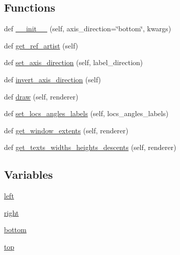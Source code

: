 \subsection*{Functions}
\begin{DoxyCompactItemize}
\item 
def \hyperlink{namespaceaxisartist_1_1axis__artist_a1e2971fc727b631279986c595e3bc496}{\+\_\+\+\_\+init\+\_\+\+\_\+} (self, axis\+\_\+direction=\char`\"{}bottom\char`\"{}, kwargs)
\item 
def \hyperlink{namespaceaxisartist_1_1axis__artist_a1740504eeff89a936875b4afc3877d80}{get\+\_\+ref\+\_\+artist} (self)
\item 
def \hyperlink{namespaceaxisartist_1_1axis__artist_aeb95e617b6b9d1470337ba529bc8f297}{set\+\_\+axis\+\_\+direction} (self, label\+\_\+direction)
\item 
def \hyperlink{namespaceaxisartist_1_1axis__artist_a51baf8d8c240bcffcaee93cf40f9e477}{invert\+\_\+axis\+\_\+direction} (self)
\item 
def \hyperlink{namespaceaxisartist_1_1axis__artist_ab4988671b9cff3610746758c6d74ffb0}{draw} (self, renderer)
\item 
def \hyperlink{namespaceaxisartist_1_1axis__artist_ad360dcaf18e33e925cb4653b00eab87a}{set\+\_\+locs\+\_\+angles\+\_\+labels} (self, locs\+\_\+angles\+\_\+labels)
\item 
def \hyperlink{namespaceaxisartist_1_1axis__artist_a47cb2fd071c18e898be29e8401f2d769}{get\+\_\+window\+\_\+extents} (self, renderer)
\item 
def \hyperlink{namespaceaxisartist_1_1axis__artist_a69d406f2ae1e537923cbb64749917bd6}{get\+\_\+texts\+\_\+widths\+\_\+heights\+\_\+descents} (self, renderer)
\end{DoxyCompactItemize}
\subsection*{Variables}
\begin{DoxyCompactItemize}
\item 
\hyperlink{namespaceaxisartist_1_1axis__artist_a313e15c7c0768e51a3ebd9ba1566047d}{left}
\item 
\hyperlink{namespaceaxisartist_1_1axis__artist_a5cda7b060b692c648a111743ac8e6659}{right}
\item 
\hyperlink{namespaceaxisartist_1_1axis__artist_ac0c8e3afc2b40cfbdff4ca573a6b0eac}{bottom}
\item 
\hyperlink{namespaceaxisartist_1_1axis__artist_abfcebdad0e09f8158552cce47fbebdfe}{top}
\end{DoxyCompactItemize}


